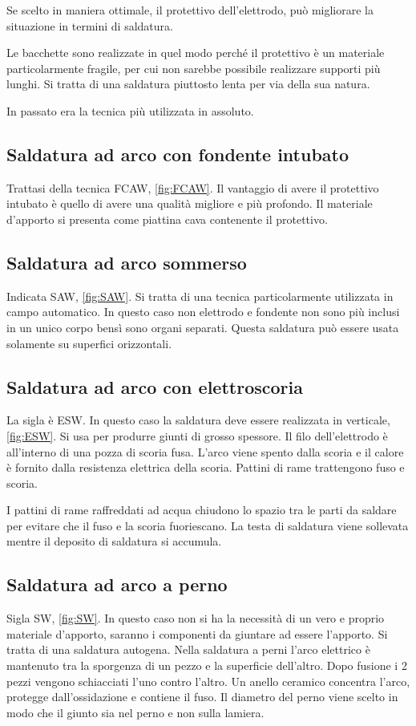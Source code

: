 Se scelto in maniera ottimale, il protettivo dell'elettrodo, può migliorare la situazione in termini di saldatura.

Le bacchette sono realizzate in quel modo perché il protettivo è un materiale particolarmente fragile, per cui non sarebbe possibile realizzare supporti più lunghi.
Si tratta di una saldatura piuttosto lenta per via della sua natura.

In passato era la tecnica più utilizzata in assoluto.

\subsection{Saldatura ad arco con fondente intubato}
Trattasi della tecnica \ac{FCAW}, \ref{fig:FCAW}.
Il vantaggio di avere il protettivo intubato è quello di avere una qualità migliore e più profondo. Il materiale d'apporto si presenta come piattina cava contenente il protettivo.

\subsection{Saldatura ad arco sommerso}
Indicata \ac{SAW}, \ref{fig:SAW}.
Si tratta di una tecnica particolarmente utilizzata in campo automatico.
In questo caso non elettrodo e fondente non sono più inclusi in un unico corpo bensì sono organi separati.
Questa saldatura può essere usata solamente su superfici orizzontali.


\subsection{Saldatura ad arco con elettroscoria}
La sigla è \ac{ESW}.
In questo caso la saldatura deve essere realizzata in verticale, \ref{fig:ESW}.
Si usa per produrre giunti di grosso spessore.
Il filo dell'elettrodo è all'interno di una pozza di scoria fusa.
L'arco viene spento dalla scoria e il calore è fornito dalla resistenza elettrica della scoria.
Pattini di rame trattengono fuso e scoria.

I pattini di rame raffreddati ad acqua chiudono lo spazio tra le parti da saldare per evitare che il fuso e la scoria fuoriescano.
La testa di saldatura viene sollevata mentre il deposito di saldatura si accumula.

\subsection{Saldatura ad arco a perno}
Sigla \ac{SW}, \ref{fig:SW}.
In questo caso non si ha la necessità di un vero e proprio materiale d'apporto, saranno i componenti da giuntare ad essere l'apporto.
Si tratta di una saldatura autogena.
Nella saldatura a perni l'arco elettrico è mantenuto tra la sporgenza di un pezzo e la superficie dell'altro.
Dopo fusione i 2 pezzi vengono schiacciati l'uno contro l'altro.
Un anello ceramico concentra l'arco, protegge dall'ossidazione e contiene il fuso.
Il diametro del perno viene scelto in modo che il giunto sia nel perno e non sulla lamiera.

